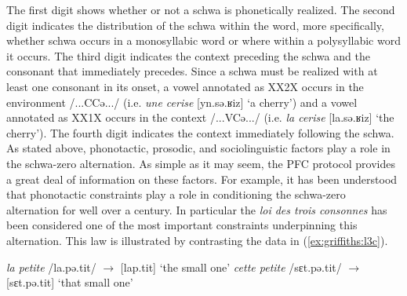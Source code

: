 \documentclass[output=paper,colorlinks,citecolor=brown,
]{langscibook}
\begin{document}
The first digit shows whether or not a schwa is phonetically realized. The second digit indicates the distribution of the schwa within the word, more specifically, whether schwa occurs in a monosyllabic word or where within a polysyllabic word it occurs. The third digit indicates the context preceding the schwa and the consonant that immediately precedes. Since a schwa must be realized with at least one consonant in its onset, a vowel annotated as XX2X occurs in the environment /...CCə.../ (i.e. \textit{une cerise} [yn.sə.ʁiz] `a cherry') and a vowel annotated as XX1X occurs in the context /...VCə.../ (i.e. \textit{la cerise} [la.sə.ʁiz] `the cherry'). The fourth digit indicates the context immediately following the schwa. As stated above, phonotactic, prosodic, and sociolinguistic factors play a role in the schwa-zero alternation. As simple as it may seem, the PFC protocol provides a great deal of information on these factors. For example, it has been understood that phonotactic constraints play a role in conditioning the schwa-zero alternation for well over a century. In particular the \textit{loi des trois consonnes} \citep{grammont} has been considered one of the most important constraints underpinning this alternation. This law is illustrated by contrasting the data in (\ref{ex:griffiths:l3c}).

\begin{exe}
\ex\label{ex:griffiths:l3c} \begin{xlist}
\ex\label{ex:griffiths:l2c} \textit{la petite} /la.pə.tit/ $\rightarrow$ [lap.tit] `the small one'
\ex\label{ex:griffiths:l3} \textit{cette petite} /sɛt.pə.tit/ $\rightarrow$ [sɛt.pə.tit] `that small one'
\end{xlist}
\end{exe}
\end{document}
